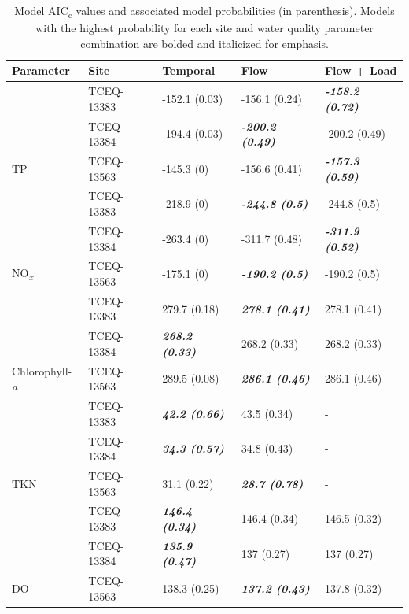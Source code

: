\documentclass[water,article,submit,oneauthor]{Definitions/mdpi}
\begin{document}
\begin{table}[H]

\caption{\label{tab:unnamed-chunk-1}Model AIC\textsubscript{c} values and associated model probabilities (in parenthesis). Models with the highest probability for each site and water quality parameter combination are bolded and italicized for emphasis.}
\centering
\begin{tabular}[t]{ll>{}l>{}l>{}l}
\toprule
Parameter & Site & Temporal & Flow & Flow + Load\\
\midrule
 & TCEQ-13383 & -152.1 (0.03) & -156.1 (0.24) & \em{\textbf{-158.2 (0.72)}}\\

 & TCEQ-13384 & -194.4 (0.03) & \em{\textbf{-200.2 (0.49)}} & -200.2 (0.49)\\

\multirow{-3}{*}{\raggedright\arraybackslash TP} & TCEQ-13563 & -145.3 (0) & -156.6 (0.41) & \em{\textbf{-157.3 (0.59)}}\\
\cmidrule{1-5}
 & TCEQ-13383 & -218.9 (0) & \em{\textbf{-244.8 (0.5)}} & -244.8 (0.5)\\

 & TCEQ-13384 & -263.4 (0) & -311.7 (0.48) & \em{\textbf{-311.9 (0.52)}}\\

\multirow{-3}{*}{\raggedright\arraybackslash NO\textsubscript{\emph{x}}} & TCEQ-13563 & -175.1 (0) & \em{\textbf{-190.2 (0.5)}} & -190.2 (0.5)\\
\cmidrule{1-5}
 & TCEQ-13383 & 279.7 (0.18) & \em{\textbf{278.1 (0.41)}} & 278.1 (0.41)\\

 & TCEQ-13384 & \em{\textbf{268.2 (0.33)}} & 268.2 (0.33) & 268.2 (0.33)\\

\multirow{-3}{*}{\raggedright\arraybackslash Chlorophyll-\emph{a}} & TCEQ-13563 & 289.5 (0.08) & \em{\textbf{286.1 (0.46)}} & 286.1 (0.46)\\
\cmidrule{1-5}
 & TCEQ-13383 & \em{\textbf{42.2 (0.66)}} & 43.5 (0.34) & -\\

 & TCEQ-13384 & \em{\textbf{34.3 (0.57)}} & 34.8 (0.43) & -\\

\multirow{-3}{*}{\raggedright\arraybackslash TKN} & TCEQ-13563 & 31.1 (0.22) & \em{\textbf{28.7 (0.78)}} & -\\
\cmidrule{1-5}
 & TCEQ-13383 & \em{\textbf{146.4 (0.34)}} & 146.4 (0.34) & 146.5 (0.32)\\

 & TCEQ-13384 & \em{\textbf{135.9 (0.47)}} & 137 (0.27) & 137 (0.27)\\

\multirow{-3}{*}{\raggedright\arraybackslash DO} & TCEQ-13563 & 138.3 (0.25) & \em{\textbf{137.2 (0.43)}} & 137.8 (0.32)\\
\bottomrule
\end{tabular}
\end{table}
\end{document}
